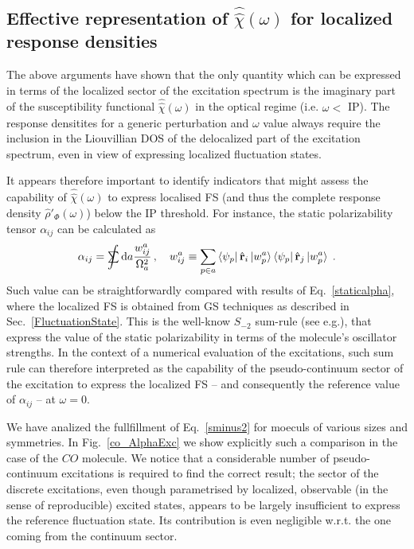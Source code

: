 \documentclass[reprint,aps,prb]{revtex4-1}
\newcommand{\dd}{{\rm d}}
\newcommand{\sint}{\mathrlap{\displaystyle\int}
\mathrlap{\textstyle\sum}
\phantom{\mathrlap{\displaystyle
\int}\textstyle\sum}}
\newcommand{\be}{\begin{equation}}
\newcommand{\ee}{\end{equation}}
\newcommand{\lb}{\label}
\newcommand{\op}[1]{\hat {#1}}
\newcommand{\sop}[1]{\op{\op {#1}}}
\newcommand{\dm}{\op{\rho}}
\newcommand{\fscd}[1]{\mathrm{Im}\ket{f_p^{\mathbf r_j}(\omega)^{#1}}}
\begin{document}

\subsection{Effective representation of $\sop \chi(\omega)$ for localized response densities}
The above arguments have shown that the only quantity which can be expressed in terms
of the localized sector of the excitation spectrum is the imaginary part of the
susceptibility functional $\sop \chi(\omega)$ in the optical regime (i.e. $\omega <$  IP).
The response densitites for a generic perturbation and $\omega$ value always require the
inclusion in the Liouvillian DOS of the delocalized part of the excitation spectrum, even in view of expressing localized fluctuation states.

It appears therefore important to identify indicators that might assess the capability of
$\sop \chi(\omega)$ to express localised FS (and thus the complete response density $\dm'_\Phi(\omega)$) below the IP threshold.
For instance, the static polarizability tensor $\alpha_{ij}$ can be calculated as
\be\lb{sminus2}
\alpha_{ij} = \sint \dd a \frac{w^a_{ij}}{\Omega_a^2}\,, \quad w^a_{ij} \equiv \sum_{p\in a} \bra{\psi_p} \op {\mathbf r}_i \ket{w_p^a}\bra{\psi_p} \op {\mathbf r}_j \ket{w_p^a}\;.
\ee
%
Such value can be straightforwardly compared with results of Eq.~\eqref{staticalpha}, where the localized FS is obtained from GS techniques as
described in Sec.~\ref{FluctuationState}.
This is the well-know $S_{-2}$ sum-rule (see e.g.\cite{Wagner2012}), that express the value of the static polarizability
in terms of the molecule's oscillator strengths.
In the context of a numerical evaluation of the excitations, such sum rule can therefore interpreted as the capability of the pseudo-continuum sector of the excitation to
express the localized FS -- and consequently the reference value of $\alpha_{ij}$ -- at $\omega=0$.

We have analized the fullfillment of Eq.~\eqref{sminus2} for moeculs of various
sizes and symmetries.
In Fig.~\ref{co_AlphaExc} we show explicitly such a comparison in the case of the $CO$ molecule.
We notice that a considerable number of pseudo-continuum excitations is required
to find the correct result; the sector of the discrete excitations, even though
parametrised by localized, observable (in the sense of reproducible) excited states,
appears to be largely insufficient to express the reference fluctuation state. Its contribution is even negligible w.r.t.
the one coming from the continuum sector.
\end{document}
